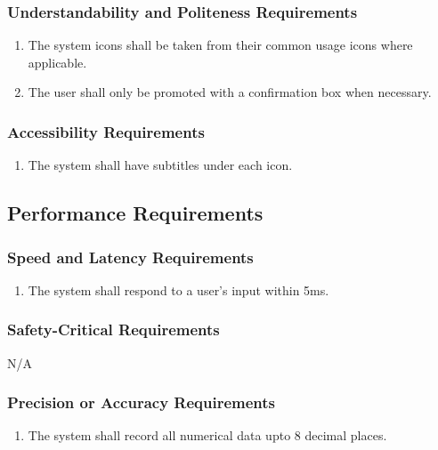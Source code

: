 \documentclass[]{article}
\begin{document}
\subsubsection{Understandability and Politeness Requirements}
\label{ssub:understandability_and_politeness_requirements}
\begin{enumerate}[start=5, label={UH\arabic*.}]
    \item The system icons shall be taken from their common usage icons where 
    applicable. 
    \item The user shall only be promoted with a confirmation box when necessary.
\end{enumerate}

\subsubsection{Accessibility Requirements}
\label{ssub:accessibility_requirements}
\begin{enumerate}[start=7, label={UH\arabic*.}]
	\item The system shall have subtitles under each icon.
\end{enumerate}

\subsection{Performance Requirements}
\label{sub:performance_requirements}

\subsubsection{Speed and Latency Requirements}
\label{ssub:speed_and_latency_requirements}
\begin{enumerate}[start=1, label={PR\arabic*.}]
	\item The system shall respond to a user’s input within 5ms.
\end{enumerate}

\subsubsection{Safety-Critical Requirements}
\label{ssub:safety_critical_requirements}
N/A

\subsubsection{Precision or Accuracy Requirements}
\label{ssub:precision_or_accuracy_requirements}
\begin{enumerate}[start=2, label={PR\arabic*.}]
	\item The system shall record all numerical data upto 8 decimal places.
\end{enumerate}
\end{document}
